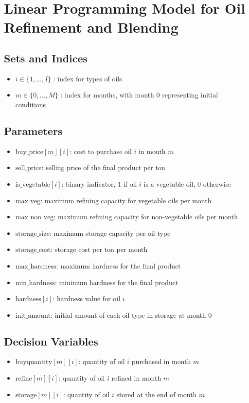 \documentclass{article}
\begin{document}
\section*{Linear Programming Model for Oil Refinement and Blending}

\subsection*{Sets and Indices}
\begin{itemize}
    \item \( i \in \{1, \ldots, I\} \) : index for types of oils
    \item \( m \in \{0, \ldots, M\} \) : index for months, with month 0 representing initial conditions
\end{itemize}

\subsection*{Parameters}
\begin{itemize}
    \item \( \text{buy\_price}[m][i] \): cost to purchase oil \( i \) in month \( m \)
    \item \( \text{sell\_price} \): selling price of the final product per ton
    \item \( \text{is\_vegetable}[i] \): binary indicator, 1 if oil \( i \) is a vegetable oil, 0 otherwise
    \item \( \text{max\_veg} \): maximum refining capacity for vegetable oils per month
    \item \( \text{max\_non\_veg} \): maximum refining capacity for non-vegetable oils per month
    \item \( \text{storage\_size} \): maximum storage capacity per oil type
    \item \( \text{storage\_cost} \): storage cost per ton per month
    \item \( \text{max\_hardness} \): maximum hardness for the final product
    \item \( \text{min\_hardness} \): minimum hardness for the final product
    \item \( \text{hardness}[i] \): hardness value for oil \( i \)
    \item \( \text{init\_amount} \): initial amount of each oil type in storage at month 0
\end{itemize}

\subsection*{Decision Variables}
\begin{itemize}
    \item \( \text{buyquantity}[m][i] \): quantity of oil \( i \) purchased in month \( m \)
    \item \( \text{refine}[m][i] \): quantity of oil \( i \) refined in month \( m \)
    \item \( \text{storage}[m][i] \): quantity of oil \( i \) stored at the end of month \( m \)
\end{itemize}
\end{document}
